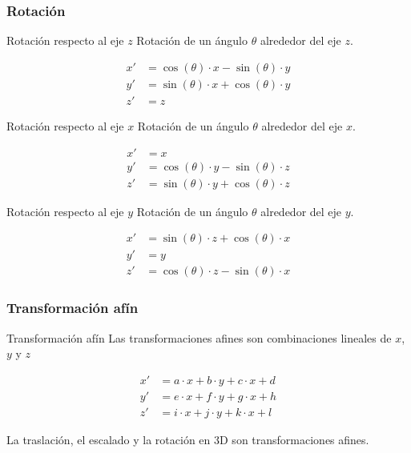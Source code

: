 \documentclass[a4paper, twoside]{article}
\begin{document}
\subsubsection{Rotación}

\begin{definicion*}{Rotación respecto al eje $z$}
	Rotación de un ángulo $\theta$ alrededor del eje $z$.

	\begin{align*}
		x' &= \cos(\theta) \cdot x - \sin(\theta) \cdot y \\
		y' &= \sin(\theta) \cdot x + \cos(\theta) \cdot y \\
		z' &= z
	\end{align*}
\end{definicion*}

\begin{definicion*}{Rotación respecto al eje $x$}
	Rotación de un ángulo $\theta$ alrededor del eje $x$.

	\begin{align*}
		x' &= x \\
		y' &= \cos(\theta) \cdot y - \sin(\theta) \cdot z \\
		z' &= \sin(\theta) \cdot y + \cos(\theta) \cdot z
	\end{align*}
\end{definicion*}

\begin{definicion*}{Rotación respecto al eje $y$}
	Rotación de un ángulo $\theta$ alrededor del eje $y$.

	\begin{align*}
		x' &= \sin(\theta) \cdot z + \cos(\theta) \cdot x \\
		y' &= y \\
		z' &= \cos(\theta) \cdot z - \sin(\theta) \cdot x
	\end{align*}
\end{definicion*}

\subsubsection{Transformación afín}

\begin{definicion*}{Transformación afín}
	Las transformaciones afines son combinaciones lineales de $x$, $y$ y $z$

	\begin{align*}
		x' &= a \cdot x + b \cdot y + c \cdot x + d \\
		y' &= e \cdot x + f \cdot y + g \cdot x + h \\
		z' &= i \cdot x + j \cdot y + k \cdot x + l
	\end{align*}

	La traslación, el escalado y la rotación en 3D son transformaciones afines.
\end{definicion*}
\end{document}
